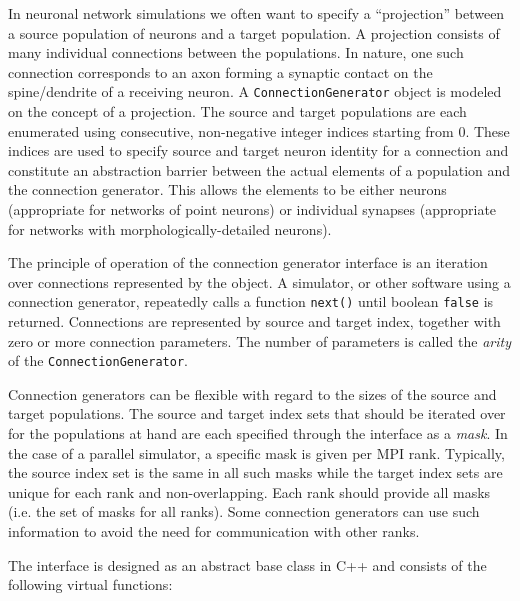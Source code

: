 \documentclass{frontiersSCNS} %
\begin{document}
In neuronal network simulations we often want to specify a
``projection'' between a source population of neurons and a target
population.  A projection consists of many individual connections
between the populations.  In nature, one such connection corresponds
to an axon forming a synaptic contact on the spine/dendrite of a
receiving neuron.  A \verb|ConnectionGenerator| object is modeled on
the concept of a projection.  The source and target populations are
each enumerated using consecutive, non-negative integer indices
starting from 0.  These indices are used to specify source and target
neuron identity for a connection and constitute an abstraction barrier
between the actual elements of a population and the connection
generator.  This allows the elements to be either neurons (appropriate
for networks of point neurons) or individual synapses (appropriate for
networks with morphologically-detailed neurons).

The principle of operation of the connection generator interface is an
iteration over connections represented by the object.  A simulator, or
other software using a connection generator, repeatedly calls a
function \verb|next()| until boolean \verb|false| is
returned. Connections are represented by source and target index,
together with zero or more connection parameters.  The number of
parameters is called the \emph{arity} of the
\verb|ConnectionGenerator|.

Connection generators can be flexible with regard to the sizes of the
source and target populations. The source and target index sets that
should be iterated over for the populations at hand are each specified
through the interface as a \emph{mask}.  In the case of a parallel
simulator, a specific mask is given per MPI rank.  Typically, the
source index set is the same in all such masks while the target index
sets are unique for each rank and non-overlapping.  Each rank should
provide all masks (i.e. the set of masks for all ranks). Some
connection generators can use such information to avoid the need for
communication with other ranks.

The interface is designed as an abstract base class in C++
and consists of the following virtual functions:
\end{document}
